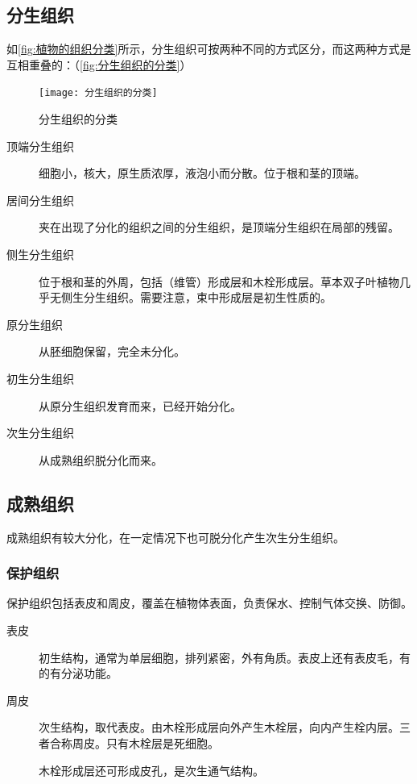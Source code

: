 	\subsection{分生组织}
	
	如\autoref{fig:植物的组织分类}所示，分生组织可按两种不同的方式区分，而这两种方式是互相重叠的：（\autoref{fig:分生组织的分类}）
	
	\begin{figure}[htbp]
		\centering
		\texttt{[image: 分生组织的分类]}
		\caption{分生组织的分类}
		\label{fig:分生组织的分类}
	\end{figure}
	
	\begin{description}
		\item[顶端分生组织] 细胞小，核大，原生质浓厚，液泡小而分散。位于根和茎的顶端。
		\item[居间分生组织] 夹在出现了分化的组织之间的分生组织，是顶端分生组织在局部的残留。
		\item[侧生分生组织] 位于根和茎的外周，包括（维管）形成层和木栓形成层。草本双子叶植物几乎无侧生分生组织。需要注意，束中形成层是初生性质的。
		\item[原分生组织] 从胚细胞保留，完全未分化。
		\item[初生分生组织] 从原分生组织发育而来，已经开始分化。
		\item[次生分生组织] 从成熟组织脱分化而来。
	\end{description}
	
	\subsection{成熟组织}
	
	成熟组织有较大分化，在一定情况下也可脱分化产生次生分生组织。
	
	\subsubsection{保护组织}
	
	保护组织包括表皮和周皮，覆盖在植物体表面，负责保水、控制气体交换、防御。
	
	\begin{description}
		\item[表皮] 初生结构，通常为单层细胞，排列紧密，外有角质。表皮上还有表皮毛，有的有分泌功能。
		\item[周皮] 次生结构，取代表皮。由木栓形成层向外产生木栓层，向内产生栓内层。三者合称周皮。只有木栓层是死细胞。
		
		木栓形成层还可形成皮孔，是次生通气结构。
	\end{description}
	
